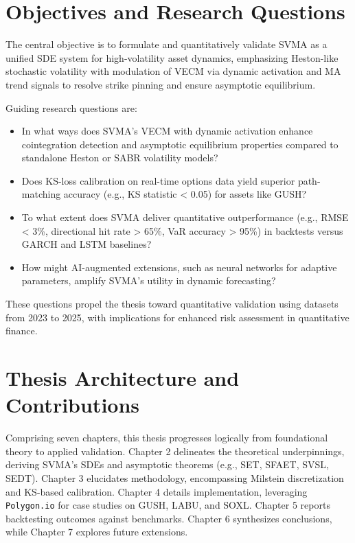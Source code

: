 \documentclass[12pt]{report}
\begin{document}
\section{Objectives and Research Questions}

The central objective is to formulate and quantitatively validate SVMA as a unified SDE system for high-volatility asset dynamics, emphasizing Heston-like stochastic volatility with modulation of VECM via dynamic activation and MA trend signals to resolve strike pinning and ensure asymptotic equilibrium.

\vspace{0.2in}

Guiding research questions are:
\begin{itemize}\setlength{\itemsep}{0pt}\setlength{\parskip}{4pt}
    \item In what ways does SVMA’s VECM with dynamic activation enhance cointegration detection and asymptotic equilibrium properties compared to standalone Heston or SABR volatility models?
    \item Does KS-loss calibration on real-time options data yield superior path-matching accuracy (e.g., KS statistic < 0.05) for assets like GUSH?
    \item To what extent does SVMA deliver quantitative outperformance (e.g., RMSE < 3\%, directional hit rate > 65\%, VaR accuracy > 95\%) in backtests versus GARCH and LSTM baselines?
\item How might AI-augmented extensions, such as neural networks for adaptive parameters, amplify SVMA’s utility in dynamic forecasting?
\end{itemize}
These questions propel the thesis toward quantitative validation using datasets from 2023 to 2025, with implications for enhanced risk assessment in quantitative finance.

\section{Thesis Architecture and Contributions}

Comprising seven chapters, this thesis progresses logically from foundational theory to applied validation. Chapter 2 delineates the theoretical underpinnings, deriving SVMA’s SDEs and asymptotic theorems (e.g., SET, SFAET, SVSL, SEDT). Chapter 3 elucidates methodology, encompassing Milstein discretization and KS-based calibration. Chapter 4 details implementation, leveraging \texttt{Polygon.io} for case studies on GUSH, LABU, and SOXL. Chapter 5 reports backtesting outcomes against benchmarks. Chapter 6 synthesizes conclusions, while Chapter 7 explores future extensions.
\end{document}
